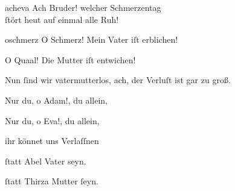 \documentclass[tocstyle=ref-genre]{ees}
\begin{document}
{\begin{movement}{acheva}
  \voice[Sunam]
  Ach Bruder! welcher Schmerzentag\\
  ſtört heut auf einmal alle Ruh!
\end{movement}

\begin{movement}{oschmerz}
  \voice[Sunam]
  O Schmerz! Mein Vater iſt erblichen!

  \voice[Hamiel]
  O Quaal! Die Mutter iſt entwichen!

  \voice[beyde]
  Nun ſind wir vatermutterlos,
  ach, der Verluſt ist gar zu groß.

  \voice[Sunam]
  Nur du, o Adam!, du allein,

  \voice[Hamiel]
  Nur du, o Eva!, du allein,

  \voice[beyde]
  ihr könnet uns Verlaſſnen

  \voice[Sunam]
  ſtatt Abel Vater seyn.

  \voice[Hamiel]
  ſtatt Thirza Mutter ſeyn.
\end{movement}




}

\eesScore
\end{document}
